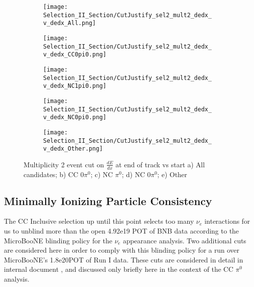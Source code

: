 \begin{figure}[H]
\centering
  \begin{subfigure}[t]{0.36\textwidth}
    \centering
\texttt{[image: Selection\_II\_Section/CutJustify\_sel2\_mult2\_dedx\_v\_dedx\_All.png]}
    \caption{ }
  \end{subfigure} 
  \hspace{10mm}
  \begin{subfigure}[t]{0.36\textwidth}
    \centering
\texttt{[image: Selection\_II\_Section/CutJustify\_sel2\_mult2\_dedx\_v\_dedx\_CC0pi0.png]}
    \caption{ }
  \end{subfigure} 
  \begin{subfigure}[t]{0.36\textwidth}
    \centering
\texttt{[image: Selection\_II\_Section/CutJustify\_sel2\_mult2\_dedx\_v\_dedx\_NC1pi0.png]}
    \caption{ }
  \end{subfigure} 
  \hspace{10mm}
  \begin{subfigure}[t]{0.36\textwidth}
    \centering
\texttt{[image: Selection\_II\_Section/CutJustify\_sel2\_mult2\_dedx\_v\_dedx\_NC0pi0.png]}
    \caption{ }
  \end{subfigure} 
  \begin{subfigure}[t]{0.36\textwidth}
    \centering
\texttt{[image: Selection\_II\_Section/CutJustify\_sel2\_mult2\_dedx\_v\_dedx\_Other.png]}
    \caption{ }
  \end{subfigure} 

\caption{ Multiplicity 2 event cut on $\frac{dE}{dx}$ at end of track vs start a) All candidates; b) CC 0$\pi^0$; c) NC $\pi^0$; d) NC 0$\pi^0$; e) Other }
\label{fig:cutjust_sel2_mult2_dedx_v_dedx}
\end{figure}




\clearpage
\subsection{ Minimally Ionizing Particle Consistency}

The CC Inclusive selection up until this point selects too many $\nu_e$ interactions for us to unblind more than the open 4.92e19 POT of BNB data according to the MicroBooNE blinding policy for the $\nu_e$ appearance analysis. Two additional cuts are considered here in order to comply with this blinding policy for a run over MicroBooNE's 1.8e20POT of Run I data. These cuts are considered in detail in internal document \cite{bib:jz_unblinding_note}, and discussed only briefly here in the context of the CC $\pi^0$ analysis. 


